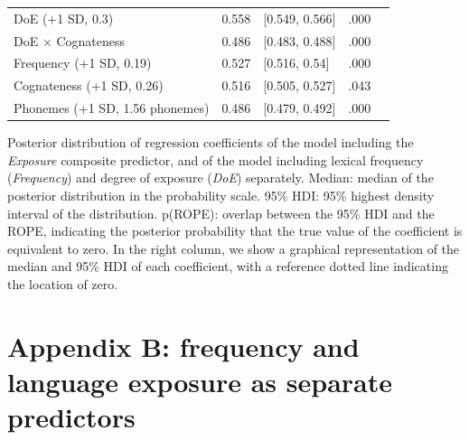 \documentclass[
]{article}
\begin{document}
\begin{table}
\begin{minipage}[t]{\linewidth}
{\begin{tabular}{lclrl}
\hspace{1em}DoE (+1 SD, 0.3) & 0.558 & {}[0.549, 0.566] & .000 & \\
\hspace{1em}DoE $\times$ Cognateness & 0.486 & {}[0.483, 0.488] & .000 & \\
\hspace{1em}Frequency (+1 SD, 0.19) & 0.527 & {}[0.516, 0.54] & .000 & \\
\hspace{1em}Cognateness (+1 SD, 0.26) & 0.516 & {}[0.505, 0.527] & .043 & \\
\hspace{1em}Phonemes (+1 SD, 1.56 phonemes) & 0.486 & {}[0.479, 0.492] & .000 & \\
\bottomrule
\end{tabular}

}

\end{minipage}%
\newline
\begin{minipage}[t]{\linewidth}

{\centering 

Posterior distribution of regression coefficients of the model including
the \emph{Exposure} composite predictor, and of the model including
lexical frequency (\emph{Frequency}) and degree of exposure (\emph{DoE})
separately. Median: median of the posterior distribution in the
probability scale. 95\% HDI: 95\% highest density interval of the
distribution. p(ROPE): overlap between the 95\% HDI and the ROPE,
indicating the posterior probability that the true value of the
coefficient is equivalent to zero. In the right column, we show a
graphical representation of the median and 95\% HDI of each coefficient,
with a reference dotted line indicating the location of zero.

}

\end{minipage}%

\end{table}

\newpage{}

\hypertarget{appendix-b-frequency-and-language-exposure-as-separate-predictors}{%
\section*{Appendix B: frequency and language exposure as separate
predictors}\label{appendix-b-frequency-and-language-exposure-as-separate-predictors}}
\end{document}
